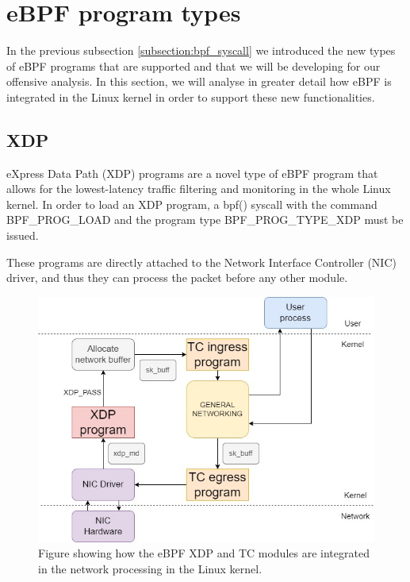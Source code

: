 \documentclass[12pt]{report} %
\begin{document}
\section{eBPF program types} \label{section:ebpf_prog_types}
In the previous subsection \ref{subsection:bpf_syscall} we introduced the new types of eBPF programs that are supported and that we will be developing for our offensive analysis. In this section, we will analyse in greater detail how eBPF is integrated in the Linux kernel in order to support these new functionalities.

\subsection{XDP} \label{subsection:xdp}
eXpress Data Path (XDP) programs are a novel type of eBPF program that allows for the lowest-latency traffic filtering and monitoring in the whole Linux kernel. In order to load an XDP program, a bpf() syscall with the command BPF\_PROG\_LOAD and the program type BPF\_PROG\_TYPE\_XDP must be issued. 

These programs are directly attached to the Network Interface Controller (NIC) driver, and thus they can process the packet before any other module\cite{xdp_gentle_intro}.

\begin{figure}[H]
	\centering
	\includegraphics[width=15cm]{xdp_diag.jpg}
	\caption{Figure showing how the eBPF XDP and TC modules are integrated in the network processing in the Linux kernel.}
	\label{fig:xdp_diag}
\end{figure}
\end{document}
